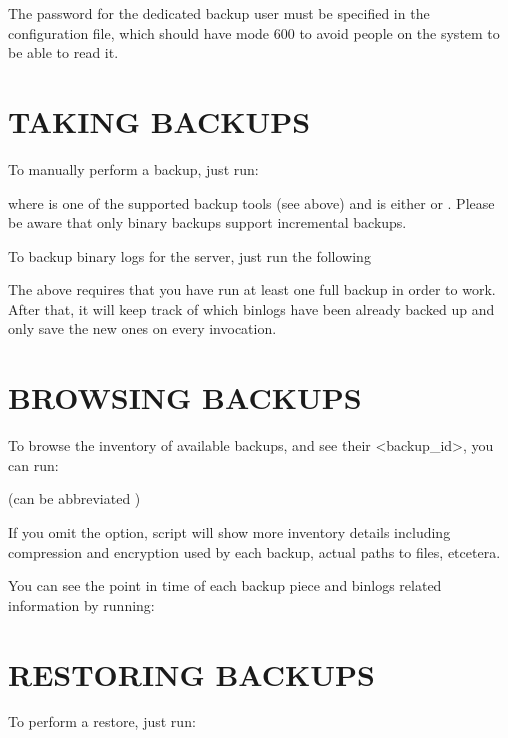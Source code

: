 \documentclass[letterpaper,10pt,english]{sphinxmanual}
\begin{document}

The password for the dedicated backup user must be specified in the configuration
file, which should have mode 600 to avoid people on the system to be able to read it.


\section{TAKING BACKUPS}
\label{\detokenize{mariadb-backup-manager:taking-backups}}
To manually perform a backup, just run:


where  is one of the supported backup tools (see above) and  is
either  or . Please be aware that only binary backups support incremental
backups.

To backup binary logs for the server, just run the following


The above requires that you have run at least one full backup in order to work. After
that, it will keep track of which binlogs have been already backed up and only
save the new ones on every invocation.


\section{BROWSING BACKUPS}
\label{\detokenize{mariadb-backup-manager:browsing-backups}}
To browse the inventory of available backups, and see their \textless{}backup\_id\textgreater{},  you can run:

 (can be abbreviated )

If you omit the  option, script will show more inventory details including
compression and encryption used by each backup, actual paths to files, etcetera.

You can see the point in time of each backup piece and binlogs related information
by running:



\section{RESTORING BACKUPS}
\label{\detokenize{mariadb-backup-manager:restoring-backups}}
To perform a restore, just run:
\end{document}
